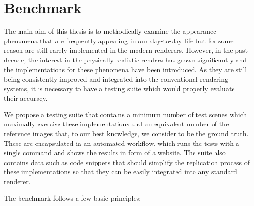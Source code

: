 \chapter{Benchmark}
\label{chap:benchmark}

The main aim of this thesis is to methodically examine the appearance phenomena that are frequently appearing in our day-to-day life but for some reason are still rarely implemented in the modern renderers. However, in the past decade, the interest in the physically realistic renders has grown significantly and the implementations for these phenomena have been introduced. As they are still being consistently improved and integrated into the conventional rendering systems, it is necessary to have a testing suite which would properly evaluate their accuracy.

We propose a testing suite that contains a minimum number of test scenes which maximally exercise these implementations and an equivalent number of the reference images that, to our best knowledge, we consider to be the ground truth. These are encapsulated in an automated workflow, which runs the tests with a single command and shows the results in form of a website. The suite also contains data such as code snippets that should simplify the replication process of these implementations so that they can be easily integrated into any standard renderer.

The benchmark follows a few basic principles:

